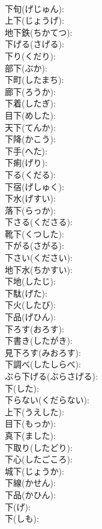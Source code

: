 \documentclass[8pt]{extreport}
\begin{document}
\begin{CJK}{UTF8}{min}
\\	下旬(げじゅん): 
\\	上下(じょうげ): 
\\	地下鉄(ちかてつ): 
\\	下げる(さげる): 
\\	下り(くだり): 
\\	部下(ぶか): 
\\	下町(したまち): 
\\	廊下(ろうか): 
\\	下着(したぎ): 
\\	目下(めした): 
\\	天下(てんか): 
\\	下降(かこう): 
\\	下手(へた): 
\\	下痢(げり): 
\\	下る(くだる): 
\\	下宿(げしゅく): 
\\	下水(げすい): 
\\	落下(らっか): 
\\	下さる(くださる): 
\\	靴下(くつした): 
\\	下がる(さがる): 
\\	下さい(ください): 
\\	地下水(ちかすい): 
\\	下地(したじ): 
\\	下駄(げた): 
\\	下火(したび): 
\\	下品(げひん): 
\\	下ろす(おろす): 
\\	下書き(したがき): 
\\	見下ろす(みおろす): 
\\	下調べ(したしらべ): 
\\	ぶら下げる(ぶらさげる): 
\\	下(した): 
\\	下らない(くだらない): 
\\	上下(うえした): 
\\	目下(もっか): 
\\	真下(ました): 
\\	下取り(したどり): 
\\	下心(したごころ): 
\\	城下(じょうか): 
\\	下線(かせん): 
\\	下品(かひん): 
\\	下(げ): 
\\	下(しも): 

\end{CJK}
\end{document}
